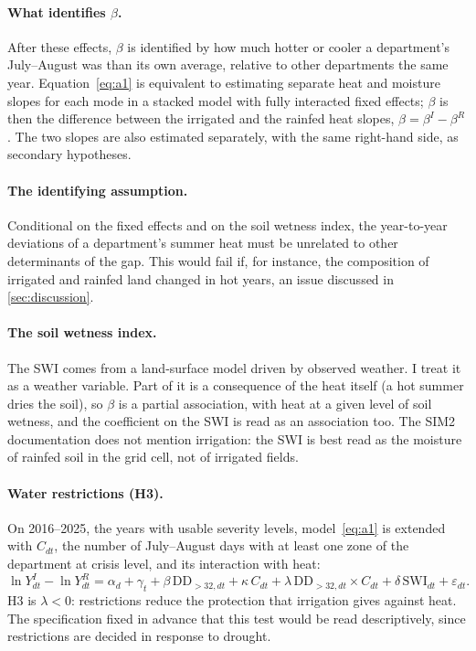 \paragraph{What identifies $\beta$.} After these effects, $\beta$ is identified by how much hotter or cooler a department's July--August was than its own average, relative to other departments the same year. Equation~\eqref{eq:a1} is equivalent to estimating separate heat and moisture slopes for each mode in a stacked model with fully interacted fixed effects; $\beta$ is then the difference between the irrigated and the rainfed heat slopes, $\beta = \beta^{I} - \beta^{R}$. The two slopes are also estimated separately, with the same right-hand side, as secondary hypotheses.

\paragraph{The identifying assumption.} Conditional on the fixed effects and on the soil wetness index, the year-to-year deviations of a department's summer heat must be unrelated to other determinants of the gap. This would fail if, for instance, the composition of irrigated and rainfed land changed in hot years, an issue discussed in \cref{sec:discussion}.

\paragraph{The soil wetness index.} The SWI comes from a land-surface model driven by observed weather. I treat it as a weather variable. Part of it is a consequence of the heat itself (a hot summer dries the soil), so $\beta$ is a partial association, with heat at a given level of soil wetness, and the coefficient on the SWI is read as an association too. The SIM2 documentation does not mention irrigation: the SWI is best read as the moisture of rainfed soil in the grid cell, not of irrigated fields.

\paragraph{Water restrictions (H3).} On 2016--2025, the years with usable severity levels, model~\eqref{eq:a1} is extended with $C_{dt}$, the number of July--August days with at least one zone of the department at crisis level, and its interaction with heat:
\begin{equation}
\label{eq:h3}
\ln Y^{I}_{dt} - \ln Y^{R}_{dt} = \alpha_d + \gamma_t + \beta\, \mathrm{DD}_{>32,dt} + \kappa\, C_{dt} + \lambda\, \mathrm{DD}_{>32,dt} \times C_{dt} + \delta\, \mathrm{SWI}_{dt} + \varepsilon_{dt}.
\end{equation}
H3 is $\lambda < 0$: restrictions reduce the protection that irrigation gives against heat. The specification fixed in advance that this test would be read descriptively, since restrictions are decided in response to drought.

